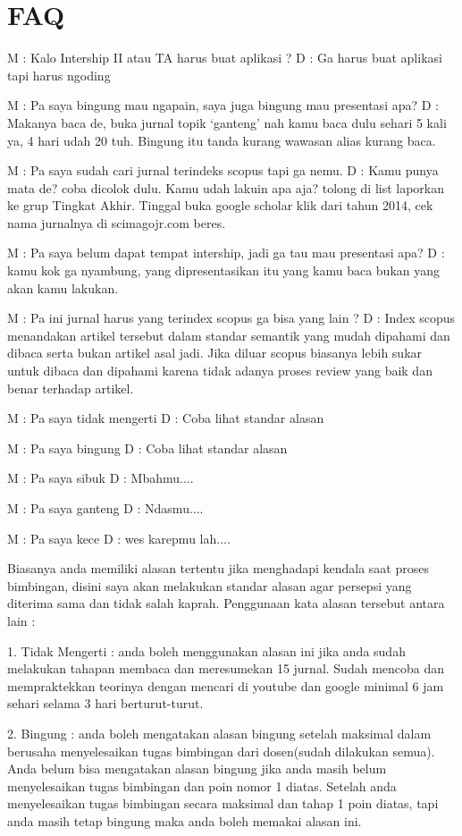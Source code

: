 \chapter{FAQ}

M : Kalo Intership II atau TA harus buat aplikasi ?
D : Ga harus buat aplikasi tapi harus ngoding

M : Pa saya bingung mau ngapain, saya juga bingung mau presentasi apa?
D : Makanya baca de, buka jurnal topik `ganteng' nah kamu baca dulu sehari 5 kali ya, 4 hari udah 20 tuh. Bingung itu tanda kurang wawasan alias kurang baca.

M : Pa saya sudah cari jurnal terindeks scopus tapi ga nemu.
D : Kamu punya mata de? coba dicolok dulu. Kamu udah lakuin apa aja? tolong di list laporkan ke grup Tingkat Akhir. Tinggal buka google scholar klik dari tahun 2014, cek nama jurnalnya di scimagojr.com beres.

M : Pa saya belum dapat tempat intership, jadi ga tau mau presentasi apa?
D : kamu kok ga nyambung, yang dipresentasikan itu yang kamu baca bukan yang akan kamu lakukan.

M : Pa ini jurnal harus yang terindex scopus ga bisa yang lain ?
D : Index scopus menandakan artikel tersebut dalam standar semantik yang mudah dipahami dan dibaca serta bukan artikel asal jadi. Jika diluar scopus biasanya lebih sukar untuk dibaca dan dipahami karena tidak adanya proses review yang baik dan benar terhadap artikel.

M : Pa saya tidak mengerti
D : Coba lihat standar alasan

M : Pa saya bingung
D : Coba lihat standar alasan

M : Pa saya sibuk
D : Mbahmu....

M : Pa saya ganteng
D : Ndasmu....

M : Pa saya kece
D : wes karepmu lah....


Biasanya anda memiliki alasan tertentu jika menghadapi kendala saat proses bimbingan, disini saya akan melakukan standar alasan agar persepsi yang diterima sama dan tidak salah kaprah. Penggunaan kata alasan tersebut antara lain :

1. Tidak Mengerti : anda boleh menggunakan alasan ini jika anda sudah melakukan tahapan membaca dan meresumekan 15 jurnal. Sudah mencoba dan mempraktekkan teorinya dengan mencari di youtube dan google minimal 6 jam sehari selama 3 hari berturut-turut.

2. Bingung : anda boleh mengatakan alasan bingung setelah maksimal dalam berusaha menyelesaikan tugas bimbingan dari dosen(sudah dilakukan semua). Anda belum bisa mengatakan alasan bingung jika anda masih belum menyelesaikan tugas bimbingan dan poin nomor 1 diatas. Setelah anda menyelesaikan tugas bimbingan secara maksimal dan tahap 1 poin diatas, tapi anda masih tetap bingung maka anda boleh memakai alasan ini.